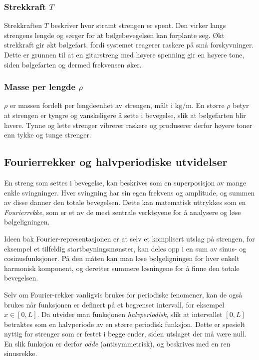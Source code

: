 \subsubsection{Strekkraft \texorpdfstring{$T$}{T}}
Strekkraften $T$ beskriver hvor stramt strengen er spent. 
Den virker langs strengens lengde og sørger for at bølgebevegelsen kan forplante seg. 
Økt strekkraft gir økt bølgefart, fordi systemet reagerer raskere på små forskyvninger. 
Dette er grunnen til at en gitarstreng med høyere spenning gir en høyere tone, siden bølgefarten og dermed frekvensen øker. 
\parencite{NTNUBolgelikning}

\subsubsection{Masse per lengde \texorpdfstring{$\rho$}{rho}}
$\rho$ er massen fordelt per lengdeenhet av strengen, målt i $\text{kg/m}$. 
En større $\rho$ betyr at strengen er tyngre og vanskeligere å sette i bevegelse, slik at bølgefarten blir lavere. 
Tynne og lette strenger vibrerer raskere og produserer derfor høyere toner enn tykke og tunge strenger.

\subsection{Fourierrekker og halvperiodiske utvidelser}

En streng som settes i bevegelse, kan beskrives som en superposisjon av mange enkle svingninger.  
Hver svingning har sin egen frekvens og amplitude, og summen av disse danner den totale bevegelsen.  
Dette kan matematisk uttrykkes som en \textit{Fourierrekke}, som er et av de mest sentrale verktøyene for å analysere og løse bølgeligningen.  

Ideen bak Fourier-representasjonen er at selv et komplisert utslag på strengen, for eksempel et tilfeldig startbøyningsmønster, kan deles opp i en sum av sinus- og cosinusfunksjoner.  
På den måten kan man løse bølgeligningen for hver enkelt harmonisk komponent, og deretter summere løsningene for å finne den totale bevegelsen.  

Selv om Fourier-rekker vanligvis brukes for periodiske fenomener, kan de også brukes når funksjonen er definert på et begrenset intervall, for eksempel $x \in [0,L]$.  
Da utvider man funksjonen \textit{halvperiodisk}, slik at intervallet $[0,L]$ betraktes som en halvperiode av en større periodisk funksjon.  
Dette er spesielt nyttig for strenger som er festet i begge ender, siden utslaget der må være null.  
En slik funksjon er derfor \textit{odde} (antisymmetrisk), og beskrives med en ren sinusrekke. \parencite{intmathHalfRange}

